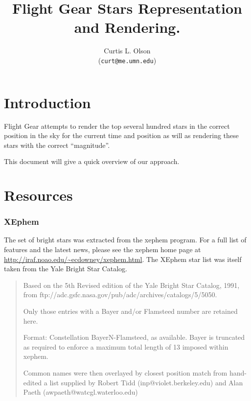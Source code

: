 \documentclass[12pt]{article}
\begin{document}
\title{
  Flight Gear Stars Representation and Rendering.
}


\author{
    Curtis L. Olson\\ 
    (\texttt{curt@me.umn.edu})
}


\maketitle


\section{Introduction}

Flight Gear attempts to render the top several hundred stars in the
correct position in the sky for the current time and position as will
as rendering these stars with the correct ``magnitude''.

This document will give a quick overview of our approach.

\section{Resources}

\subsubsection{XEphem}

The set of bright stars was extracted from the xephem program.  For a
full list of features and the latest news, please see the xephem home
page at \url{http://iraf.noao.edu/~ecdowney/xephem.html}.  The XEphem
star list was itself taken from the Yale Bright Star Catalog.

\begin{quote}
  Based on the 5th Revised edition of the Yale Bright Star Catalog,
  1991, from ftp://adc.gsfc.nasa.gov/pub/adc/archives/catalogs/5/5050.
  
  Only those entries with a Bayer and/or Flamsteed number are retained
  here.
  
  Format: Constellation BayerN-Flamsteed, as available. Bayer is
  truncated as required to enforce a maximum total length of 13
  imposed within xephem.
  
  Common names were then overlayed by closest position match from
  hand-edited a list supplied by Robert Tidd (inp@violet.berkeley.edu)
  and Alan Paeth (awpaeth@watcgl.waterloo.edu)
\end{quote}
\end{document}
